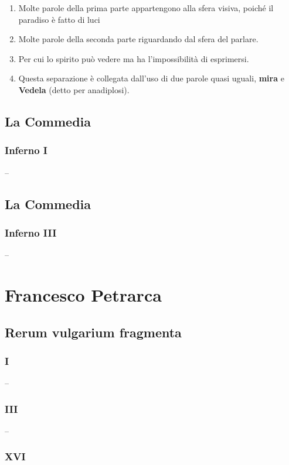 \documentclass{article}
\begin{document}
\begin{enumerate}
    \item Molte parole della prima parte appartengono alla sfera visiva, poiché il paradiso è fatto di luci
    \item Molte parole della seconda parte riguardando dal sfera del parlare.
    \item Per cui lo spirito può vedere ma ha l'impossibilità di esprimersi.
    \item Questa separazione è collegata dall'uso di due parole quasi uguali, \textbf{mira} e \textbf{Vedela} (detto per anadiplosi).
\end{enumerate}

\newpage
\subsection{La Commedia}
\subsubsection{Inferno I}

--

\newpage
\subsection{La Commedia}
\subsubsection{Inferno III}

--

\newpage
\section{Francesco Petrarca}
\subsection{Rerum vulgarium fragmenta}
\subsubsection{I}

--

\newpage
\subsubsection{III}

--

\newpage
\subsubsection{XVI}
\end{document}
